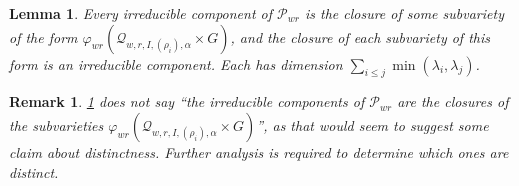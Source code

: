\documentclass[12pt,psamsfonts]{article}
\newtheorem{lemma}[theorem]{Lemma}
\newtheorem{remark}[theorem]{Remark}
\begin{document}
\begin{lemma}\label{pwr_comps}
    Every irreducible component of \(\mathcal{P}_{wr}\) is the closure of some subvariety of the form \(\varphi_{wr}(\mathcal{Q}_{w,r,I,(\rho_i),\alpha} \times G)\), and the closure of each subvariety of this form is an irreducible component.
    Each has dimension \(\sum_{i \leq j} \min(\lambda_i, \lambda_j)\).
\end{lemma}
\begin{remark}
    \cref{pwr_comps} does not say ``the irreducible components of \(\mathcal{P}_{wr}\) are the closures of the subvarieties \(\varphi_{wr}(\mathcal{Q}_{w,r,I,(\rho_i),\alpha} \times G)\)'', as that would seem to suggest some claim about distinctness.
    Further analysis is required to determine which ones are distinct.
\end{remark}
\end{document}
